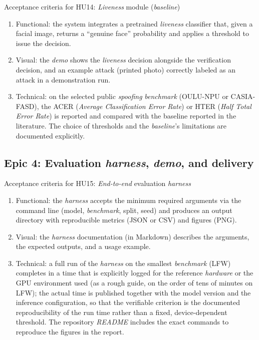 \documentclass[
  11pt, %
]{charter}
\begin{document}
Acceptance criteria for HU14: \textit{Liveness} module (\textit{baseline})
\begin{enumerate}
  \item Functional: the system integrates a pretrained \textit{liveness} classifier that, given a facial image, returns a ``genuine face'' probability and applies a threshold to issue the decision.
  \item Visual: the \textit{demo} shows the \textit{liveness} decision alongside the verification decision, and an example attack (printed photo) correctly labeled as an attack in a demonstration run.
  \item Technical: on the selected public \textit{spoofing} \textit{benchmark} (OULU-NPU or CASIA-FASD), the ACER (\textit{Average Classification Error Rate}) or HTER (\textit{Half Total Error Rate}) is reported and compared with the baseline reported in the literature. The choice of thresholds and the \textit{baseline}'s limitations are documented explicitly.
\end{enumerate}

\subsection{Epic 4: Evaluation \textit{harness}, \textit{demo}, and delivery}

Acceptance criteria for HU15: \textit{End-to-end} evaluation \textit{harness}
\begin{enumerate}
  \item Functional: the \textit{harness} accepts the minimum required arguments via the command line (model, \textit{benchmark}, split, seed) and produces an output directory with reproducible metrics (JSON or CSV) and figures (PNG).
  \item Visual: the \textit{harness} documentation (in Markdown) describes the arguments, the expected outputs, and a usage example.
  \item Technical: a full run of the \textit{harness} on the smallest \textit{benchmark} (LFW) completes in a time that is explicitly logged for the reference \textit{hardware} or the GPU environment used (as a rough guide, on the order of tens of minutes on LFW); the actual time is published together with the model version and the inference configuration, so that the verifiable criterion is the documented reproducibility of the run time rather than a fixed, device-dependent threshold. The repository \textit{README} includes the exact commands to reproduce the figures in the report.
\end{enumerate}
\end{document}
